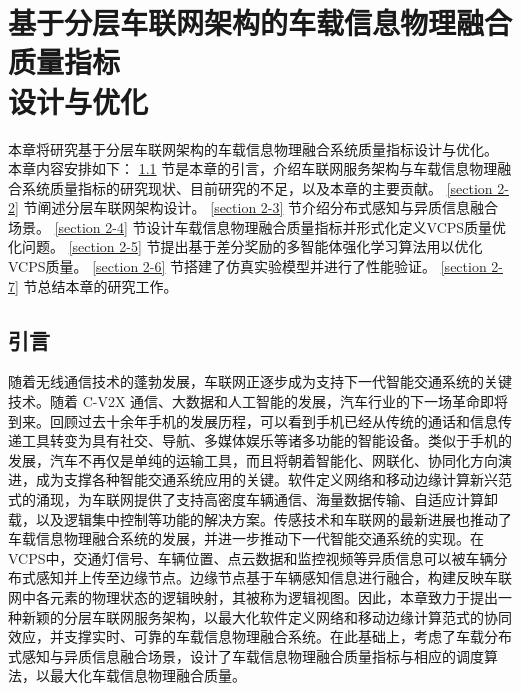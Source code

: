 \chapter[基于分层车联网架构的车载信息物理融合质量指标设计与优化]{基于分层车联网架构的车载信息物理融合质量指标\\设计与优化}
本章将研究基于分层车联网架构的车载信息物理融合系统质量指标设计与优化。
本章内容安排如下：
\ref{section 2-1} 节是本章的引言，介绍车联网服务架构与车载信息物理融合系统质量指标的研究现状、目前研究的不足，以及本章的主要贡献。
\ref{section 2-2} 节阐述分层车联网架构设计。
\ref{section 2-3} 节介绍分布式感知与异质信息融合场景。
\ref{section 2-4} 节设计车载信息物理融合质量指标并形式化定义VCPS质量优化问题。
\ref{section 2-5} 节提出基于差分奖励的多智能体强化学习算法用以优化VCPS质量。
\ref{section 2-6} 节搭建了仿真实验模型并进行了性能验证。
\ref{section 2-7} 节总结本章的研究工作。

\section{引言}\label{section 2-1}

随着无线通信技术的蓬勃发展，车联网正逐步成为支持下一代智能交通系统的关键技术。随着 C-V2X 通信、大数据和人工智能的发展，汽车行业的下一场革命即将到来。回顾过去十余年手机的发展历程，可以看到手机已经从传统的通话和信息传递工具转变为具有社交、导航、多媒体娱乐等诸多功能的智能设备。类似于手机的发展，汽车不再仅是单纯的运输工具，而且将朝着智能化、网联化、协同化方向演进，成为支撑各种智能交通系统应用的关键。软件定义网络\cite{li2021zhi}和移动边缘计算\cite{liu2022fedcpf}新兴范式的涌现，为车联网提供了支持高密度车辆通信、海量数据传输、自适应计算卸载，以及逻辑集中控制等功能的解决方案。传感技术和车联网的最新进展也推动了车载信息物理融合系统的发展，并进一步推动下一代智能交通系统的实现。在VCPS中，交通灯信号、车辆位置、点云数据和监控视频等异质信息可以被车辆分布式感知并上传至边缘节点。边缘节点基于车辆感知信息进行融合，构建反映车联网中各元素的物理状态的逻辑映射，其被称为逻辑视图。因此，本章致力于提出一种新颖的分层车联网服务架构，以最大化软件定义网络和移动边缘计算范式的协同效应，并支撑实时、可靠的车载信息物理融合系统。在此基础上，考虑了车载分布式感知与异质信息融合场景，设计了车载信息物理融合质量指标与相应的调度算法，以最大化车载信息物理融合质量。

